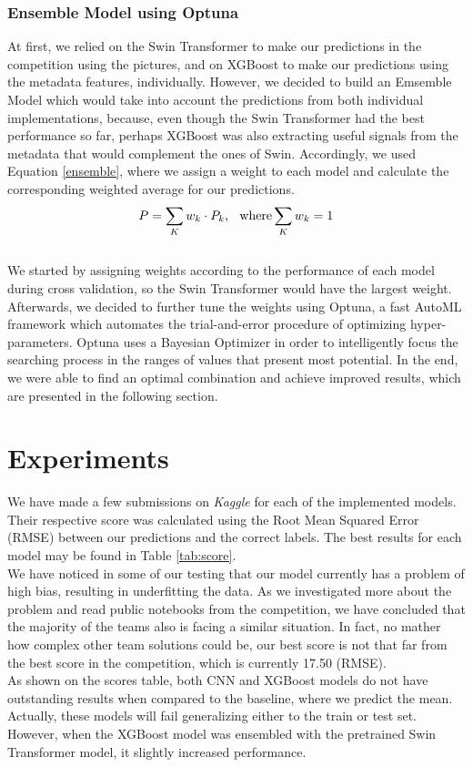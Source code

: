 \documentclass{article}
\begin{document}
\subsubsection{Ensemble Model using Optuna}
At first, we relied on the Swin Transformer to make our predictions in the competition using the pictures, and on XGBoost to make our predictions using the metadata features, individually. However, we decided to build an Emsemble Model which would take into account the predictions from both individual implementations, because, even though the Swin Transformer had the best performance so far, perhaps XGBoost was also extracting useful signals from the metadata that would complement the ones of Swin. Accordingly, we used Equation \ref{ensemble}, where we assign a weight to each model and calculate the corresponding weighted average for our predictions.\\
\begin{align} \label{ensemble}
    P = \sum_K w_k \cdot P_k\textrm{, \> where} \sum_K w_k = 1
\end{align}\\
We started by assigning weights according to the performance of each model during cross validation, so the Swin Transformer would have the largest weight. Afterwards, we decided to further tune the weights using Optuna, a fast AutoML framework which automates the trial-and-error procedure of optimizing hyper-parameters. Optuna uses a Bayesian Optimizer in order to intelligently focus the searching process in the ranges of values that present most potential. In the end, we were able to find an optimal combination and achieve improved results, which are presented in the following section.

\section{Experiments}
We have made a few submissions on \textit{Kaggle} for each of the implemented models. Their respective score was calculated using the Root Mean Squared Error (RMSE) between our predictions and the correct labels. The best results for each model may be found in Table \ref{tab:score}.\\
We have noticed in some of our testing that our model currently has a problem of high bias, resulting in  underfitting the data. As we investigated more about the problem and read public notebooks from the competition, we have concluded that the majority of the teams also is facing a similar situation. In fact, no mather how complex other team solutions could be, our best score is not that far from the best score in the competition, which is currently 17.50 (RMSE).\\
As shown on the scores table, both CNN and XGBoost models do not have outstanding results when compared to the baseline, where we predict the mean. Actually, these models will fail generalizing either to the train or test set. However, when the XGBoost model was ensembled with the pretrained Swin Transformer model, it slightly increased performance.
\end{document}
